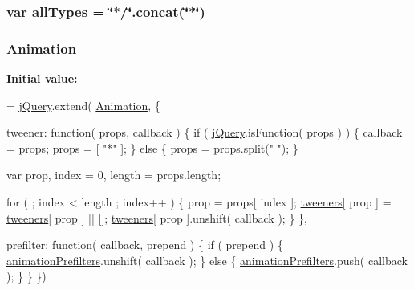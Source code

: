 \hypertarget{jquery-1_89_81_8js_a2d6199559f6d1e840af674910a329b04}{
\subsubsection[{all\+Types}]{\setlength{\rightskip}{0pt plus 5cm}var all\+Types = \char`\"{}$\ast$/\char`\"{}.concat(\char`\"{}$\ast$\char`\"{})}}\label{jquery-1_89_81_8js_a2d6199559f6d1e840af674910a329b04}
\hypertarget{jquery-1_89_81_8js_a3299b781c8ec8287357326920ab3565a}{
\subsubsection[{Animation}]{ Animation}}\label{jquery-1_89_81_8js_a3299b781c8ec8287357326920ab3565a}
{\bfseries Initial value\+:}
\begin{DoxyCode}
= \hyperlink{jquery-1_89_81_8js_add5237586d970a38a81f990e8eb28c6c}{jQuery}.extend( \hyperlink{jquery-1_89_81_8js_a3299b781c8ec8287357326920ab3565a}{Animation}, \{

    tweener: \textcolor{keyword}{function}( props, callback ) \{
        \textcolor{keywordflow}{if} ( \hyperlink{jquery-1_89_81_8js_add5237586d970a38a81f990e8eb28c6c}{jQuery}.isFunction( props ) ) \{
            callback = props;
            props = [ \textcolor{stringliteral}{"*"} ];
        \} \textcolor{keywordflow}{else} \{
            props = props.split(\textcolor{stringliteral}{" "});
        \}

        var prop,
            index = 0,
            length = props.length;

        \textcolor{keywordflow}{for} ( ; index < length ; index++ ) \{
            prop = props[ index ];
            \hyperlink{jquery-1_89_81_8js_a948afd2431eec272c99689edddfb6850}{tweeners}[ prop ] = \hyperlink{jquery-1_89_81_8js_a948afd2431eec272c99689edddfb6850}{tweeners}[ prop ] || [];
            \hyperlink{jquery-1_89_81_8js_a948afd2431eec272c99689edddfb6850}{tweeners}[ prop ].unshift( callback );
        \}
    \},

    prefilter: \textcolor{keyword}{function}( callback, prepend ) \{
        \textcolor{keywordflow}{if} ( prepend ) \{
            \hyperlink{jquery-1_89_81_8js_adb3f17c5359fbc12b7043b6969553d78}{animationPrefilters}.unshift( callback );
        \} \textcolor{keywordflow}{else} \{
            \hyperlink{jquery-1_89_81_8js_adb3f17c5359fbc12b7043b6969553d78}{animationPrefilters}.push( callback );
        \}
    \}
\})
\end{DoxyCode}
